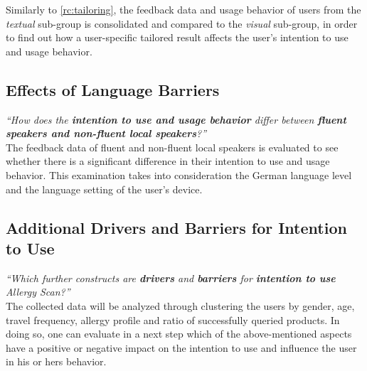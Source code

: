 Similarly to \cref{rc:tailoring}, the feedback data and usage behavior of users from the \emph{textual} sub-group is consolidated and compared to the \emph{visual} sub-group, in order to find out how a user-specific tailored result affects the user's intention to use and usage behavior.

\subsection{Effects of Language Barriers}
\textit{\enquote{How does the \textbf{intention to use and usage behavior} differ between \textbf{fluent speakers and non-fluent local speakers}?}}\\

The feedback data of fluent and non-fluent local speakers is evaluated to see whether there is a significant difference in their intention to use and usage behavior. This examination takes into consideration the German language level and the language setting of the user’s device.




\subsection{Additional Drivers and Barriers for Intention to Use}
\textit{\enquote{Which further constructs are \textbf{drivers} and \textbf{barriers} for \textbf{intention to use} Allergy Scan?}}\\

The collected data will be analyzed through clustering the users by gender, age, travel frequency, allergy profile and ratio of successfully queried products. In doing so, one can evaluate in a next step which of the above-mentioned aspects have a positive or negative impact on the intention to use and influence the user in his or hers behavior.
